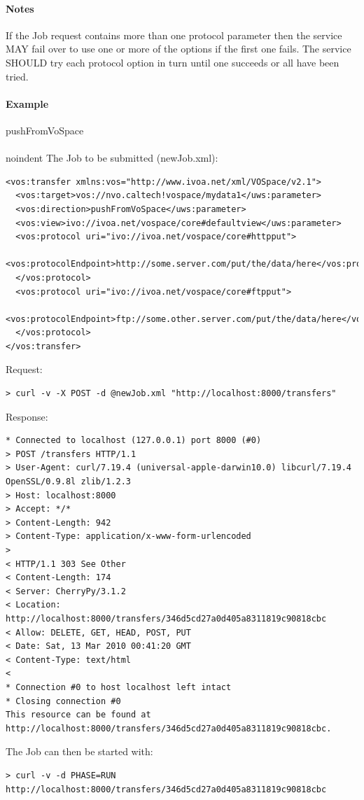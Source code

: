 \documentclass[11pt,a4paper]{ivoa}
\begin{document}
\paragraph{Notes}
If the Job request contains more than one protocol parameter then the service MAY fail over to use one or more of the options if the first one fails. The service SHOULD try each protocol option in turn until one succeeds or all have been tried.

\paragraph{Example}
pushFromVoSpace
\\[5px]
\\noindent
The Job to be submitted (newJob.xml):
\begin{lstlisting}
<vos:transfer xmlns:vos="http://www.ivoa.net/xml/VOSpace/v2.1">
  <vos:target>vos://nvo.caltech!vospace/mydata1</uws:parameter>
  <vos:direction>pushFromVoSpace</uws:parameter>
  <vos:view>ivo://ivoa.net/vospace/core#defaultview</uws:parameter>
  <vos:protocol uri="ivo://ivoa.net/vospace/core#httpput">
    <vos:protocolEndpoint>http://some.server.com/put/the/data/here</vos:protocolEndpoint>
  </vos:protocol>
  <vos:protocol uri="ivo://ivoa.net/vospace/core#ftpput">
    <vos:protocolEndpoint>ftp://some.other.server.com/put/the/data/here</vos:protocolEndpoint>
  </vos:protocol>
</vos:transfer>
\end{lstlisting}
Request:
\begin{lstlisting}
> curl -v -X POST -d @newJob.xml "http://localhost:8000/transfers"
\end{lstlisting}
Response:
\begin{lstlisting}
* Connected to localhost (127.0.0.1) port 8000 (#0)
> POST /transfers HTTP/1.1
> User-Agent: curl/7.19.4 (universal-apple-darwin10.0) libcurl/7.19.4 OpenSSL/0.9.8l zlib/1.2.3
> Host: localhost:8000
> Accept: */*
> Content-Length: 942
> Content-Type: application/x-www-form-urlencoded
> 
< HTTP/1.1 303 See Other
< Content-Length: 174
< Server: CherryPy/3.1.2
< Location: http://localhost:8000/transfers/346d5cd27a0d405a8311819c90818cbc
< Allow: DELETE, GET, HEAD, POST, PUT
< Date: Sat, 13 Mar 2010 00:41:20 GMT
< Content-Type: text/html
< 
* Connection #0 to host localhost left intact
* Closing connection #0
This resource can be found at http://localhost:8000/transfers/346d5cd27a0d405a8311819c90818cbc.
\end{lstlisting}
The Job can then be started with:
\begin{lstlisting}
> curl -v -d PHASE=RUN http://localhost:8000/transfers/346d5cd27a0d405a8311819c90818cbc
\end{lstlisting}
\end{document}
